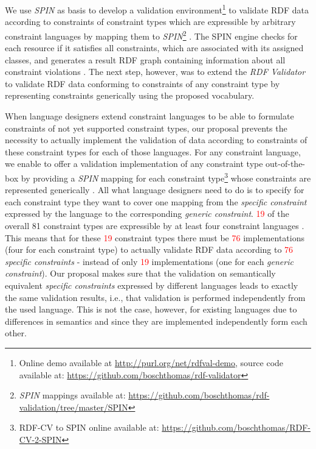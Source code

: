 \documentclass[a4paper,fontsize=11pt]{scrartcl}
\begin{document}
We use \emph{SPIN} as basis to develop a validation environment\footnote{Online demo available at \url{http://purl.org/net/rdfval-demo}, source code available at: \url{https://github.com/boschthomas/rdf-validator}\label{rdf-validator}} to validate RDF data according to constraints of constraint types which are expressible by arbitrary constraint languages by mapping them to \emph{SPIN}\footnote{\emph{SPIN} mappings available at: \url{https://github.com/boschthomas/rdf-validation/tree/master/SPIN}\label{spin-mappings}} \cite{BoschEckert2014-2}.
The SPIN engine checks for each resource if it satisfies all constraints, which are associated with its assigned classes, and generates a result RDF graph containing information about all constraint violations \cite{BoschEckert2014-2}.
The next step, however, was to extend the \emph{RDF Validator} to validate RDF data conforming to constraints of any constraint type
by representing constraints generically using the proposed vocabulary. 
 
When language designers extend constraint languages 
to be able to formulate constraints of not yet supported constraint types,
our proposal prevents the necessity to actually implement the validation of data
according to constraints of these constraint types for each of those languages.  
For any constraint language, we enable to offer a validation implementation of any constraint type out-of-the-box
by providing a \emph{SPIN} mapping
for each constraint type\footnote{RDF-CV to SPIN online available at: \url{https://github.com/boschthomas/RDF-CV-2-SPIN}\label{RDF-CV-2-SPIN}}  
whose constraints are represented generically \cite{BoschEckert2015-2}.
All what language designers need to do is to specify for each constraint type they want to cover one mapping from the \emph{specific constraint} expressed by the language to the corresponding \emph{generic constraint}.
\textcolor{red}{19} of the overall 81 constraint types are expressible by at least four constraint languages \cite{BoschNolleAcarEckert2015}.
This means that for these \textcolor{red}{19} constraint types there must be \textcolor{red}{76} implementations (four for each constraint type) to actually validate RDF data according to \textcolor{red}{76} \emph{specific constraints} - instead of only \textcolor{red}{19} implementations (one for each \emph{generic constraint}). 
Our proposal makes sure that the validation on semantically equivalent \emph{specific constraints} expressed by different languages
leads to exactly the same validation results, 
i.e., that validation is performed independently from the used language.
This is not the case, however, for existing languages due to differences in semantics and since they are implemented independently form each other.
\end{document}
